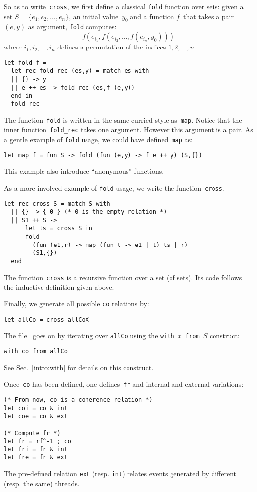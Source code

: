 So as to write~\texttt{cross},
we first define a classical \texttt{fold} function over sets:
given a set $S = \{ e_1, e_2, \ldots, e_n\}$, an initial value~$y_0$
and a function $f$~that takes a pair $(e,y)$ as argument,
\texttt{fold} computes:
$$
f (e_{i_1},f (e_{i_2}, \ldots, f(e_{i_n},y_0)))  
$$
where $i_1, i_2, \ldots, i_n$ defines a permutation
of the indices $1, 2, \ldots, n$.
\begin{verbatim}
let fold f =
  let rec fold_rec (es,y) = match es with
  || {} -> y
  || e ++ es -> fold_rec (es,f (e,y))
  end in
  fold_rec
\end{verbatim}
The function~\texttt{fold} is written in the same curried style as~\texttt{map}.
Notice that the inner function~\verb+fold_rec+ takes one argument.
However this argument is a pair.
As a gentle example of \texttt{fold} usage, we could have
defined~\texttt{map} as:
\begin{verbatim}
let map f = fun S -> fold (fun (e,y) -> f e ++ y) (S,{})
\end{verbatim}
This example also introduce ``anonymous'' functions.


As a more involved example of \texttt{fold} usage, we
 write the function~\texttt{cross}.
\begin{verbatim}
let rec cross S = match S with
  || {} -> { 0 } (* 0 is the empty relation *)
  || S1 ++ S ->
      let ts = cross S in
      fold
        (fun (e1,r) -> map (fun t -> e1 | t) ts | r)
        (S1,{})
  end      
\end{verbatim}
The function~\texttt{cross} is a recursive function over a set (of sets).
Its code follows the inductive definition given above.

Finally, we generate all possible \texttt{co} relations by:
\begin{verbatim}
let allCo = cross allCoX
\end{verbatim}

The file~ goes on by iterating over \texttt{allCo} using
the \texttt{with $x$ from~$S$} construct:
\begin{verbatim}
with co from allCo
\end{verbatim}
See Sec.~\ref{intro:with} for details on this construct.

Once~\texttt{co} has been defined, one defines~\texttt{fr} and
internal and external variations:
\begin{verbatim}
(* From now, co is a coherence relation *)
let coi = co & int
let coe = co & ext

(* Compute fr *)
let fr = rf^-1 ; co
let fri = fr & int
let fre = fr & ext
\end{verbatim}
The pre-defined relation \texttt{ext} (resp. \texttt{int}) relates
events generated by different (resp. the same) threads.


